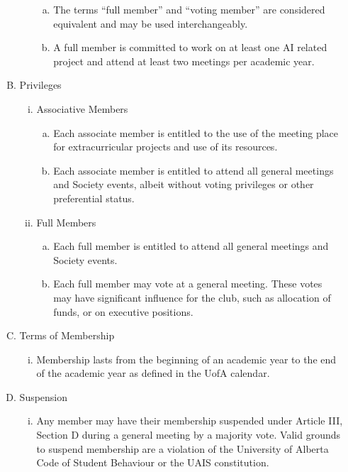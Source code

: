 \documentclass[11pt]{article}
\begin{document}
\begin{enumerate}[I.]
\begin{enumerate}[A)]
\begin{enumerate}[i)]
\begin{enumerate}[a)]
              \item The terms ``full member'' and ``voting member'' are
                considered equivalent and may be used interchangeably.
              \item A full member is committed to work on at least one AI related project and attend at least two meetings per academic year.
            \end{enumerate}
        \end{enumerate}
      \item Privileges
        \begin{enumerate}[i)]
          \item Associative Members
            \begin{enumerate}[a)]
              \item Each associate member is entitled to the use of the meeting place for extracurricular projects and use of its resources.
              \item Each associate member is entitled to attend all general meetings and Society events, albeit without voting privileges or other preferential status.
            \end{enumerate}
          \item Full Members
            \begin{enumerate}[a)]
              \item Each full member is entitled to attend all general meetings and Society events.
              \item Each full member may vote at a general meeting. These votes may have significant influence for the club, such as allocation of funds, or on executive positions.
            \end{enumerate}
        \end{enumerate}
      \item Terms of Membership
        \begin{enumerate}[i)]
          \item Membership lasts from the beginning of an academic year to the end of the academic year as defined in the UofA calendar.
        \end{enumerate}
      \item Suspension
        \begin{enumerate}[i)]
          \item Any member may have their membership suspended under Article III, Section D during a general meeting by a majority vote. Valid grounds to suspend membership are a violation of the University of Alberta Code of Student Behaviour or the UAIS constitution.

\end{enumerate}
\end{enumerate}
\end{enumerate}
\end{document}
